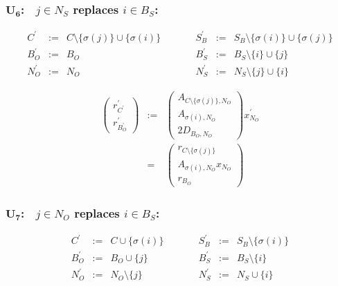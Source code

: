 \documentclass[a4paper]{article}
\begin{document}
\subsubsection{$\mathbf{U_{6}}$:$\quad j \in N_{S}$ replaces $i \in B_{S}$:}
\begin{equation}
\label{update:s_rep_s}
\begin{array}{ccccccc}
C^{\prime}      &:=&  C \setminus \{\sigma(j)\} \cup \{\sigma(i)\}
&\quad\quad&
S_{B}^{\prime}  &:=&  S_{B} \setminus \{\sigma(i)\} \cup \{\sigma(j)\} \\
B_{O}^{\prime}  &:=&  B_{O}
&\quad\quad&
B_{S}^{\prime}  &:=&  B_{S} \setminus \{i\} \cup \{j\}  \\
N_{O}^{\prime}  &:=&  N_{O}
&\quad\quad&
N_{S}^{\prime}  &:=&  N_{S} \setminus \{j\} \cup \{i\} 
\end{array}
\end{equation}

\begin{eqnarray}
\left(
\begin{array}{c}
r_{C^{\prime}}^{\prime} \\
\hline
r_{B_{O}^{\prime}}^{\prime}
\end{array}
\right)
&:=&
\left(
\begin{array}{c}
A_{C \setminus \{\sigma(j)\}, N_{O}} \\
\hline
A_{\sigma(i), N_{O}} \\
\hline
2D_{B_{O}, N_{O}}
\end{array}
\right)
x_{N_{O}}^{\prime} \\
&=&
\left(
\begin{array}{c}
r_{C \setminus \{\sigma(j)\}} \\
\hline
A_{\sigma(i), N_{O}}x_{N_{O}} \\
\hline
r_{B_{O}}
\end{array}
\right)
\end{eqnarray}


\subsubsection{$\mathbf{U_{7}}$:$\quad j \in N_{O}$ replaces $i \in B_{S}$:}
\begin{equation}
\label{update:o_rep_s}
\begin{array}{ccccccc}
C^{\prime}      &:=&  C \cup \{\sigma(i)\}
&\quad\quad&
S_{B}^{\prime}  &:=&  S_{B} \setminus \{\sigma(i)\} \\
B_{O}^{\prime}  &:=&  B_{O} \cup \{j\}
&\quad\quad&
B_{S}^{\prime}  &:=&  B_{S} \setminus \{i\}  \\
N_{O}^{\prime}  &:=&  N_{O} \setminus \{j\}
&\quad\quad&
N_{S}^{\prime}  &:=&  N_{S} \cup \{i\} 
\end{array}
\end{equation}
\end{document}
